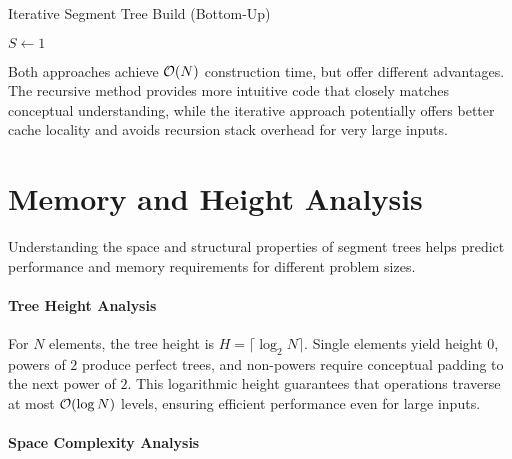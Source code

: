 \begin{algorithm}[H]
\caption{Iterative Segment Tree Build (Bottom-Up)}
$S \gets 1$\;
\end{algorithm}

Both approaches achieve $\mathcal{O}(N)$ construction time, but offer different advantages. The recursive method provides more intuitive code that closely matches conceptual understanding, while the iterative approach potentially offers better cache locality and avoids recursion stack overhead for very large inputs.

\section{Memory and Height Analysis}
\label{sec:analysis}

Understanding the space and structural properties of segment trees helps predict performance and memory requirements for different problem sizes.

\paragraph{Tree Height Analysis}

For $N$ elements, the tree height is $H = \lceil \log_2 N \rceil$. Single elements yield height $0$, powers of $2$ produce perfect trees, and non-powers require conceptual padding to the next power of $2$. This logarithmic height guarantees that operations traverse at most $\mathcal{O}(\log N)$ levels, ensuring efficient performance even for large inputs.


\paragraph{Space Complexity Analysis}

